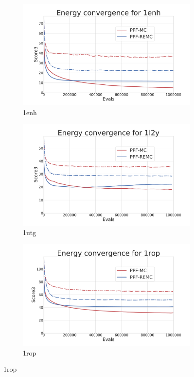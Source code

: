 \begin{figure}[ht]\ContinuedFloat
  \begin{subfigure}{0.7\linewidth}
    \centering
    \includegraphics[width=1\linewidth]{Figuras/plots/energy_convergence/energy_convergence_1enh.pdf}
    \caption{1enh}
  \end{subfigure}
%
  \begin{subfigure}{0.7\linewidth}
    \centering
    \includegraphics[width=1\linewidth]{Figuras/plots/energy_convergence/energy_convergence_1l2y.pdf}
    \caption{1utg}
  \end{subfigure}
%
  \begin{subfigure}{0.7\linewidth}
    \centering
    \includegraphics[width=1\linewidth]{Figuras/plots/energy_convergence/energy_convergence_1rop.pdf}
    \caption{1rop}
  \end{subfigure}
\end{figure}

